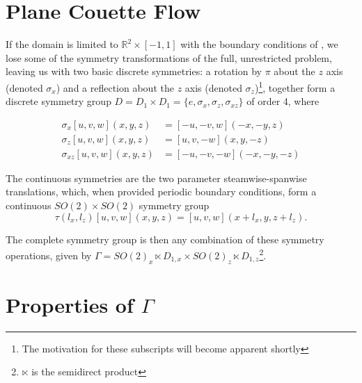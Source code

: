\section{Plane Couette Flow}

If the domain is limited to $\mathbb{R}^2 \times [-1,1]$ with the boundary conditions of \pCf, we lose some of the symmetry transformations of the full, unrestricted problem, leaving us with two basic discrete symmetries: a rotation by $\pi$ about the $z$ axis (denoted $\sigma_x$) and a reflection about the $z$ axis (denoted $\sigma_z$)\footnote{The motivation for these subscripts will become apparent shortly}, together form a discrete symmetry group $D = D_1 \times D_1 = \{e, \sigma_x,\sigma_z,\sigma_{xz}\}$ of order 4, where

\begin{align}\label{eq:discretesymm}
\sigma_x [u,v,w](x,y,z) &= [-u,-v,w](-x,-y,z)\\
\sigma_z [u,v,w](x,y,z) &= [u,v,-w](x,y,-z)\\
\sigma_{xz} [u,v,w](x,y,z) &= [-u,-v,-w](-x,-y,-z)
\end{align}

The continuous symmetries are the two parameter steamwise-spanwise translations, which, when provided periodic boundary conditions, form a continuous $SO(2)\times SO(2)$ symmetry group 
\begin{equation}\label{eq:contsymm}
\tau(l_x,l_z)[u,v,w](x,y,z) = [u,v,w](x+l_x,y,z+l_z).
\end{equation}

The complete symmetry group is then any combination of these symmetry operations, given by $\Gamma = SO(2)_x \ltimes D_{1,x} \times SO(2)_z \ltimes D_{1,z}$\footnote{$\ltimes$ is the semidirect product}. 
\section{Properties of $\Gamma$}

